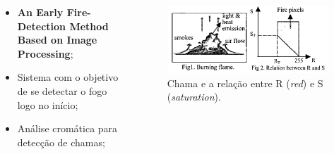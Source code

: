 \documentclass{beamer}
\begin{document}
\begin{frame}{}
\begin{columns}
    \begin{column}{0.50\textwidth}
		\begin{itemize}
			\item \textbf{An Early Fire-Detection Method Based on Image Processing};
			\item Sistema com o objetivo de se detectar o fogo logo no início;
			\item Análise cromática para detecção de chamas;
		\end{itemize}
    \end{column}

    \begin{column}{0.5\textwidth}
		\begin{figure}[H]
		    \centering
		    \begin{center}
		    \includegraphics[width=\textwidth]{img/fig1-artigo1.png}
		  \caption{Chama e a relação entre R (\textit{red}) e S (\textit{saturation}).}
		    \label{fig:sar}
		  \end{center}
		\end{figure}
    \end{column}
\end{columns}
\end{frame}

\end{document}
